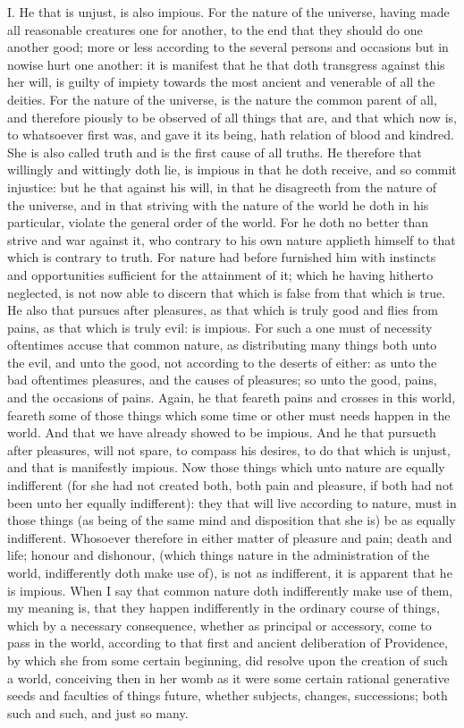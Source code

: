 I. He that is unjust, is also impious. For the nature of the universe,
having made all reasonable creatures one for another, to the end that they
should do one another good; more or less according to the several persons
and occasions but in nowise hurt one another: it is manifest that he that
doth transgress against this her will, is guilty of impiety towards the
most ancient and venerable of all the deities. For the nature of the
universe, is the nature the common parent of all, and therefore piously to
be observed of all things that are, and that which now is, to whatsoever
first was, and gave it its being, hath relation of blood and kindred. She
is also called truth and is the first cause of all truths. He therefore
that willingly and wittingly doth lie, is impious in that he doth receive,
and so commit injustice: but he that against his will, in that he
disagreeth from the nature of the universe, and in that striving with the
nature of the world he doth in his particular, violate the general order
of the world. For he doth no better than strive and war against it, who
contrary to his own nature applieth himself to that which is contrary to
truth. For nature had before furnished him with instincts and
opportunities sufficient for the attainment of it; which he having
hitherto neglected, is not now able to discern that which is false from
that which is true. He also that pursues after pleasures, as that which is
truly good and flies from pains, as that which is truly evil: is impious.
For such a one must of necessity oftentimes accuse that common nature, as
distributing many things both unto the evil, and unto the good, not
according to the deserts of either: as unto the bad oftentimes pleasures,
and the causes of pleasures; so unto the good, pains, and the occasions of
pains. Again, he that feareth pains and crosses in this world, feareth
some of those things which some time or other must needs happen in the
world. And that we have already showed to be impious. And he that pursueth
after pleasures, will not spare, to compass his desires, to do that which
is unjust, and that is manifestly impious. Now those things which unto
nature are equally indifferent (for she had not created both, both pain
and pleasure, if both had not been unto her equally indifferent): they
that will live according to nature, must in those things (as being of the
same mind and disposition that she is) be as equally indifferent.
Whosoever therefore in either matter of pleasure and pain; death and life;
honour and dishonour, (which things nature in the administration of the
world, indifferently doth make use of), is not as indifferent, it is
apparent that he is impious. When I say that common nature doth
indifferently make use of them, my meaning is, that they happen
indifferently in the ordinary course of things, which by a necessary
consequence, whether as principal or accessory, come to pass in the world,
according to that first and ancient deliberation of Providence, by which
she from some certain beginning, did resolve upon the creation of such a
world, conceiving then in her womb as it were some certain rational
generative seeds and faculties of things future, whether subjects,
changes, successions; both such and such, and just so many.

